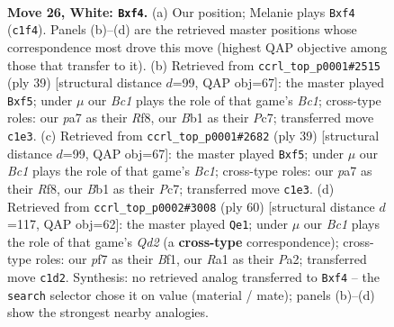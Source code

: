 \documentclass[11pt]{article}
\begin{document}
\clearpage

\begin{figure}[p]\centering
\begin{subfigure}{0.46\textwidth}\centering
\resizebox{\linewidth}{!}{%
\newchessgame
\chessboard[
  setfen={1r1r4/ppb2pk1/8/6qp/b3Pn2/5QPp/PP3P2/RBB1R1K1 w - - 0 26},
  showmover=false,
  pgfstyle=straightmove, color=movearrow, markmove={c1-f4}
]}
\caption{}
\end{subfigure}\hfill
\begin{subfigure}{0.46\textwidth}\centering
\resizebox{\linewidth}{!}{%
\newchessgame
\chessboard[
  setfen={r1b2rk1/1pp2p2/p4qp1/5B2/7p/2N1Q2P/PP4P1/R4RK1 b - - 0 20},
  showmover=false,
  pgfstyle=straightmove, color=movearrow, markmove={c8-f5}
]}
\caption{}
\end{subfigure}
\\[4pt]
\begin{subfigure}{0.46\textwidth}\centering
\resizebox{\linewidth}{!}{%
\newchessgame
\chessboard[
  setfen={r1b2rk1/1pp2p2/p4qp1/5B2/7p/2N1Q2P/PP4P1/R4RK1 b - - 0 20},
  showmover=false,
  pgfstyle=straightmove, color=movearrow, markmove={c8-f5}
]}
\caption{}
\end{subfigure}\hfill
\begin{subfigure}{0.46\textwidth}\centering
\resizebox{\linewidth}{!}{%
\newchessgame
\chessboard[
  setfen={3r1rk1/6p1/pp1pp3/6q1/2P1Rn1p/5P2/PPRQ2PP/5BK1 w - - 1 31},
  showmover=false,
  pgfstyle=straightmove, color=movearrow, markmove={d2-e1}
]}
\caption{}
\end{subfigure}
\caption{\textbf{Move 26, White: \texttt{Bxf4}.} (a) Our position; Melanie plays \texttt{Bxf4} (\texttt{c1f4}). Panels (b)--(d) are the retrieved master positions whose correspondence most drove this move (highest QAP objective among those that transfer to it). (b) Retrieved from \texttt{ccrl\_top\_p0001\#2515} (ply 39) [structural distance $d$=99, QAP obj=67]: the master played \texttt{Bxf5}; under $\mu$ our \emph{Bc1} plays the role of that game's \emph{Bc1}; cross-type roles: our \emph{p}a7 as their \emph{R}f8, our \emph{B}b1 as their \emph{P}c7; transferred move \texttt{c1e3}. (c) Retrieved from \texttt{ccrl\_top\_p0001\#2682} (ply 39) [structural distance $d$=99, QAP obj=67]: the master played \texttt{Bxf5}; under $\mu$ our \emph{Bc1} plays the role of that game's \emph{Bc1}; cross-type roles: our \emph{p}a7 as their \emph{R}f8, our \emph{B}b1 as their \emph{P}c7; transferred move \texttt{c1e3}. (d) Retrieved from \texttt{ccrl\_top\_p0002\#3008} (ply 60) [structural distance $d$=117, QAP obj=62]: the master played \texttt{Qe1}; under $\mu$ our \emph{Bc1} plays the role of that game's \emph{Qd2} (a \textbf{cross-type} correspondence); cross-type roles: our \emph{p}f7 as their \emph{B}f1, our \emph{R}a1 as their \emph{P}a2; transferred move \texttt{c1d2}. Synthesis: no retrieved analog transferred to \texttt{Bxf4} -- the \texttt{search} selector chose it on value (material / mate); panels (b)--(d) show the strongest nearby analogies.}
\label{fig:thought-m50}
\end{figure}
\end{document}
